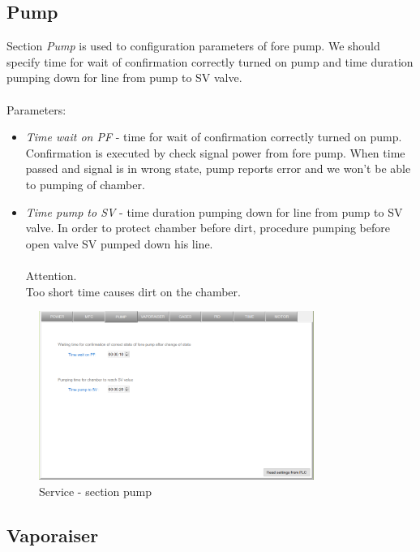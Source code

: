 \subsection{Pump}

Section \textit{Pump} is used to configuration parameters of fore pump. We should specify time for wait of confirmation correctly turned on pump and time duration pumping down for line from pump to SV valve.\\\\
Parameters:
\begin{itemize}
\item \textit{Time wait on PF} - time for wait of confirmation correctly turned on pump. Confirmation is executed by check signal power from fore pump. When time passed and signal is in wrong state, pump reports error and we won't be able to pumping of chamber.
\item \textit{Time pump to SV} - time duration pumping down for line from pump to SV valve. In order to protect chamber before dirt, procedure pumping before open valve SV  pumped down his line.\\\\
Attention.\\
Too short time causes dirt on the chamber.
\end{itemize}

	\begin{figure}[!h] 
	\centering \includegraphics[width=0.8\textwidth]{Graphic/Service/Pump.png}	
	\caption{Service - section pump}
	\label{alerts_window}
	\end{figure}
	\FloatBarrier

\subsection{Vaporaiser}


